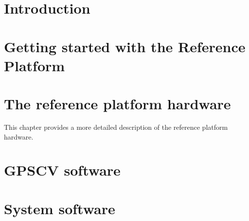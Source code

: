 \documentclass[11pt,a4paper,openany,oneside]{book}
\begin{document}
\chapter{Introduction}



\chapter{Getting started with the Reference Platform}




\chapter{The reference platform hardware}

This chapter provides a more detailed description of the reference platform hardware.





\chapter{GPSCV software}



\chapter{System software}




\end{document}
